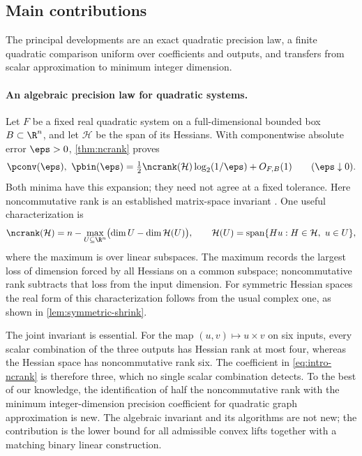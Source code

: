 \subsection{Main contributions}

The principal developments are an exact quadratic precision law, a finite
quadratic comparison uniform over coefficients and outputs, and transfers
from scalar approximation to minimum integer dimension.

\paragraph{An algebraic precision law for quadratic systems.}
Let $F$ be a fixed real quadratic system on a full-dimensional bounded
box $B\subset\R^n$, and let $\mathcal H$ be the span of its Hessians. With componentwise
absolute error $\eps>0$, \cref{thm:ncrank} proves
\begin{equation}\label{eq:intro-ncrank}
 \pconv(\eps),\ \pbin(\eps)
 =\tfrac12\ncrank(\mathcal H)\log_2(1/\eps)+O_{F,B}(1)
 \qquad(\eps\downarrow0).
\end{equation}
Both minima have this expansion; they need not agree at a fixed tolerance.
Here noncommutative rank is an established matrix-space invariant
\citep{ggow2020,iqs2018}. One useful characterization is
\[
 \ncrank(\mathcal H)
 =n-\max_{U\subseteq\R^n}
       \bigl(\dim U-\dim\mathcal H(U)\bigr),
 \qquad
 \mathcal H(U)=\operatorname{span}\{Hu:H\in\mathcal H,\ u\in U\},
\]
where the maximum is over linear subspaces. The maximum records the largest loss
of dimension forced by all Hessians on a common subspace; noncommutative
rank subtracts that loss from the input dimension. For symmetric
Hessian spaces the real form of this characterization follows from the
usual complex one, as shown in \cref{lem:symmetric-shrink}.

The joint invariant is essential. For the map $(u,v)\mapsto u\times v$
on six inputs, every scalar combination of the three outputs has Hessian
rank at most four, whereas the Hessian space has noncommutative rank six.
The coefficient in \eqref{eq:intro-ncrank} is therefore three, which no
single scalar combination detects. To the best of our knowledge, the
identification of half the noncommutative rank with the minimum
integer-dimension precision coefficient for quadratic graph approximation
is new. The algebraic invariant and its algorithms are not new; the
contribution is the lower bound for all admissible convex lifts together
with a matching binary linear construction.

